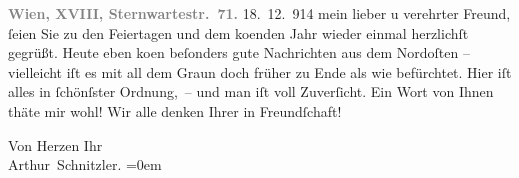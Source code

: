 \pstart
           \noindent{}\centering{}{\pb}\textcolor{gray}{\textbf{Wien, XVIII, Sternwartestr. 71.}}\pend
           \vspace{1em}
\pstart
           \raggedleft{}{\pb}18. 12. 914\pend
           \vspace{0.5em}
\pstart
           mein lieber u verehrter Freund,{ }ſeien Sie zu den Feiertagen und dem
                  ko{\geminationm}enden Jahr wieder einmal herzlichſt gegrüßt. Heute
               eben ko{\geminationm}en beſonders gute Nachrichten aus dem Nordoſten
               – vielleicht iſt es mit all dem Graun doch früher zu Ende als wie befürchtet. Hier
               iſt alles in{ }ſchönſster Ordnung, – und man iſt voll Zuverſicht. Ein Wort von Ihnen
               thäte mir wohl! Wir alle {\pb}denken Ihrer in
               Freundſchaft!\pend
           
\pstart
           Von Herzen Ihr{\\[\baselineskip]}\spacefill\mbox{Arthur Schnitzler.}\pend
           \leftskip=0em{}\endnumbering{}  \newcommand{\dateiname}{L02200}\newcommand{\titel}{Arthur Schnitzler an Georg Brandes, 18. 12. 1914}\newcommand{\editorInnen}{Martin Anton Müller und Gerd-Hermann Susen}
